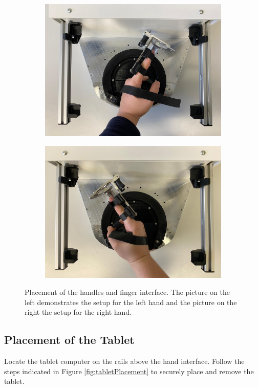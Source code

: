 \documentclass[10pt,oneside,a4paper]{article}
\begin{document}
\begin{figure}[h!]
\begin{subfigure}[b]{0.48\textwidth}
	\includegraphics[width=\textwidth]{images/Hardware/hand1.jpeg}
\end{subfigure}
\hfill
\begin{subfigure}[b]{0.48\textwidth}
	\centering
	\includegraphics[width=\textwidth]{images/Hardware/hand2.jpeg}
\end{subfigure}
\caption{Placement of the handles and finger interface. The picture on the left demonstrates the setup for the left hand and the picture on the right the setup for the right hand.}
\label{fig:HandPlacement}
\end{figure}

\subsection{Placement of the Tablet}
Locate the tablet computer on the rails above the hand interface. Follow the steps indicated in Figure \ref{fig:tabletPlacement} to securely place and remove the tablet. 
\end{document}
